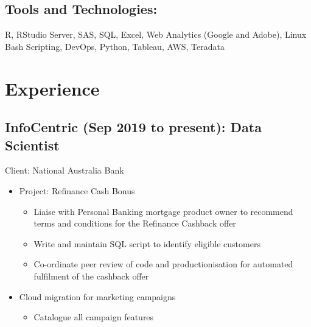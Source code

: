 \documentclass{article}
\begin{document}
\subsection{Tools and Technologies:}
R, RStudio Server, SAS, SQL, Excel, Web Analytics (Google and Adobe), Linux Bash Scripting, DevOps, Python, Tableau, AWS, Teradata

\section{Experience}


\subsection{InfoCentric (Sep 2019 to present): Data Scientist}
Client: National Australia Bank
\begin{itemize}
    \item Project: Refinance Cash Bonus
        \begin{itemize}
            \item Liaise with Personal Banking mortgage product owner to recommend terms and conditions for the Refinance Cashback offer
            \item Write and maintain SQL script to identify eligible customers
            \item Co-ordinate peer review of code and productionisation for automated fulfilment of the cashback offer
        \end{itemize}
    \item Cloud migration for marketing campaigns
        \begin{itemize}
            \item Catalogue all campaign features
        \end{itemize}
\end{itemize}
\end{document}
